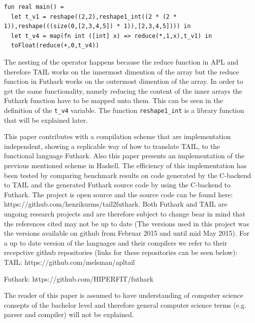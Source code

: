 \documentclass[11pt]{article}
\begin{document}
\begin{lstlisting}[numbers=none,frame=none,breaklines=true,language=Futhark]
fun real main() =
  let t_v1 = reshape((2,2),reshape1_int((2 * (2 * 1)),reshape(((size(0,[2,3,4,5]) * 1)),[2,3,4,5]))) in
  let t_v4 = map(fn int ([int] x) => reduce(*,1,x),t_v1) in
  toFloat(reduce(+,0,t_v4))
\end{lstlisting}

The nesting of the operator happens because the reduce function in APL and therefore TAIL works on the innermost dimention of the array but the reduce function in Futhark works on the outermost dimention of the array. In order to get the same functionality, namely reducing the content of the inner arrays the Futhark function have to be mapped unto them. This can be seen in the definition of the {\tt t\_v4} variable. 
The function {\tt reshape1\_int} is a library function that will be explained later. 

This paper contributes with a compilation scheme that are implementation independent, showing a replicable 
way of how to translate TAIL, to the functional language Futhark. Also 
this paper presents an implementation of the previous mentioned scheme in Haskell.
The efficiency of this implementation has been tested by comparing benchmark results on code generated by the C-backend to TAIL 
and the generated Futhark source code by using the C-backend to Futhark.
The project is open source and the source code can be found here:\\ https://github.com/henrikurms/tail2futhark.
Both Futhark and TAIL are ungoing research projects and are therefore subject to change bear in mind that the references cited may not be up to date (The versions used in this project was the versions available on github from Februar 2015 and until mid May 2015). For a up to date version of the languages and their compilers we refer to their recepctive github repositories (links for these repositories can be seen below): \\

TAIL: https://github.com/melsman/apltail

Futhark: https://github.com/HIPERFIT/futhark

The reader of this paper is assumed to have understanding of computer science consepts of the bachelor level and therefore general computer science terms (e.g. parser and compiler) will not be explained. 

\end{document}
